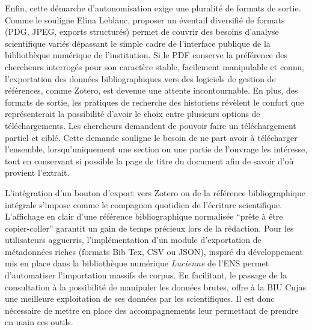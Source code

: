 Enfin, cette démarche d'autonomisation exige une pluralité de formats de sortie. Comme le souligne Elina Leblanc, proposer un éventail diversifié de formats (PDG, JPEG, exports structurés) permet de couvrir des besoins d'analyse scientifique variés dépassant le simple cadre de l'interface publique de la bibliothèque numérique de l'institution. Si le PDF conserve la préférence des chercheurs interrogés pour son caractère stable, facilement manipulable et connu, l'exportation des données bibliographiques vers des logiciels de gestion de références, comme Zotero, est devenue une attente incontournable. En plus, des formats de sortie, les pratiques de recherche des historiens révèlent le confort que représenterait la possibilité d'avoir le choix entre plusieurs options de téléchargements. Les chercheurs demandent de pouvoir faire un téléchargement partiel et ciblé. Cette demande souligne le besoin de ne part avoir à télécharger l'ensemble, lorsqu'uniquement une section ou une partie de l'ouvrage les intéresse, tout en conservant si possible la page de titre du document afin de savoir d'où provient l'extrait.

L'intégration d'un bouton d'export vers Zotero ou de la référence bibliographique intégrale s'impose comme le compagnon quotidien de l'écriture scientifique. L'affichage en clair d'une référence bibliographique normalisée \enquote{prête à être copier-coller} garantit un gain de temps précieux lors de la rédaction. Pour les utilisateurs agguerris, l'implémentation d'un module d'exportation de métadonnées riches (formats Bib Tex, CSV ou JSON), inspiré du développement mis en place dans la bibliothèque numérique \textit{Lucienne} de l'ENS permet d'automatiser l'importation massifs de corpus. En facilitant, le passage de la consultation à la possibilité de manipuler les données brutes, offre à la BIU Cujas une meilleure exploitation de ses données par les scientifiques. Il est donc nécessaire de mettre en place des accompagnements leur permettant de prendre en main ces outils.